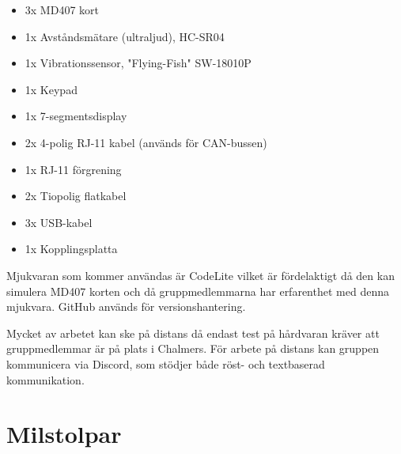 \documentclass[a4paper]{article}
\begin{document}
\begin{itemize}
    \item 3x MD407 kort
    \item 1x Avståndsmätare (ultraljud), HC-SR04
    \item 1x Vibrationssensor, "Flying-Fish" SW-18010P
    \item 1x Keypad
    \item 1x 7-segmentsdisplay
    \item 2x 4-polig RJ-11 kabel (används för CAN-bussen)
    \item 1x RJ-11 förgrening
    \item 2x Tiopolig flatkabel
    \item 3x USB-kabel
    \item 1x Kopplingsplatta
\end{itemize}

Mjukvaran som kommer användas är CodeLite vilket är fördelaktigt då den kan simulera MD407 korten och då gruppmedlemmarna har erfarenthet med denna mjukvara. GitHub används för versionshantering.

Mycket av arbetet kan ske på distans då endast test på hårdvaran kräver att gruppmedlemmar är på plats i Chalmers. För arbete på distans kan gruppen kommunicera via Discord, som stödjer både röst- och textbaserad kommunikation.

\section{Milstolpar}

\end{document}
